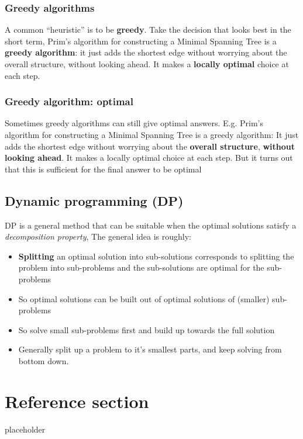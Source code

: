 \documentclass{article}
\begin{document}
\subsubsection{Greedy algorithms}
\begin{flushleft}
A common “heuristic” is to be \textbf{greedy}. Take the decision that looks best in the short term, Prim’s algorithm for constructing a Minimal Spanning Tree is a \textbf{greedy algorithm}: it just adds the shortest edge without worrying about the overall structure, without looking ahead. It makes a \textbf{locally optimal} choice at each step.
\end{flushleft}

\subsubsection{Greedy algorithm: optimal}
\begin{flushleft}
Sometimes greedy algorithms can still give optimal answers. E.g. Prim’s algorithm for constructing a Minimal Spanning Tree is a greedy algorithm: It just adds the shortest edge without worrying about the \textbf{overall structure}, \textbf{without looking ahead}. It makes a locally optimal choice at each step. But it turns out that this is sufficient for the final answer to be optimal
\end{flushleft}

\subsection{Dynamic programming (DP)}
\begin{flushleft}
DP is a general method that can be suitable when the optimal solutions satisfy a \textit{decomposition property}, The general idea is roughly:
\begin{itemize}
	\item \textbf{Splitting} an optimal solution into sub-solutions corresponds to splitting the problem into sub-problems and the sub-solutions are optimal for the sub-problems
	\item So optimal solutions can be built out of optimal solutions of (smaller) sub-problems
	\item So solve small sub-problems first and build up towards the full solution
	\item Generally split up a problem to it's smallest parts, and keep solving from bottom down.
\end{itemize}
\end{flushleft}

\pagebreak
\section*{Reference section} \label{sec:reference}
\begin{description}
	\item[placeholder] \hfill \\
\end{description}
\end{document}
